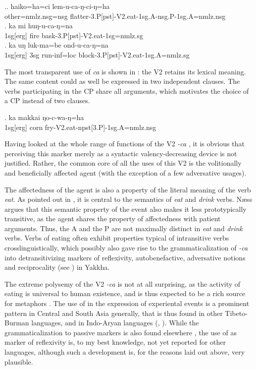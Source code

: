 \ex.\ag. haiko=ha=ci lem-u-ca-ŋ-ci-ŋ=ha\\
other{\sc =nmlz.nsg=nsg} flatter{\sc -3.P[pst]-V2.eat-1sg.A-nsg.P-1sg.A=nmlz.nsg}\\
\bg. ka mi huŋ-u-ca-ŋ=na\\
{\sc 1sg[erg]} fire bask{\sc -3.P[pst]-V2.eat-1sg=nmlz.sg}\\
\bg. ka uŋ luk-ma=be ond-u-ca-ŋ=na\\
{\sc 1sg[erg]} {\sc 3sg} run{\sc -inf=loc} block{\sc -3.P[pst]-V2.eat-1sg.A=nmlz.sg}\\

The most transparent use of \emph{ca} is shown in \Next: the V2 retains its lexical meaning. The same content could as well be expressed in two independent clauses. The verbs participating in the CP share all arguments, which motivates the choice of a CP instead of two clauses. 

\exg. ka makkai ŋo-c-wa-ŋ=ha\\
{\sc 1sg[erg]} corn fry{\sc -V2.eat-npst[3.P]-1sg.A=nmlz.nsg}\\


Having looked at the whole range of functions of the V2 \emph{-ca} , it is obvious that perceiving this marker merely as a syntactic valency-decreasing device is not justified. Rather, the common core of all the uses of this V2  is the volitionally and beneficially affected agent (with the exception of a few adversative usages). 

The affectedness of the agent is also a property of the literal meaning of the verb \emph{eat}. As pointed out in  \citet[37]{Naess2009_How}, it is central to the semantics of \emph{eat} and \emph{drink} verbs. Næss argues that this semantic property of the event also makes it less prototypically transitive, as the agent shares the property of affectedness with patient arguments. Thus, the A and the P are not maximally distinct in \emph{eat} and \emph{drink} verbs. Verbs of eating often exhibit properties typical of intransitive verbs crosslinguistically, which possibly also gave rise to the grammaticalization of \emph{-ca} into detransitivizing markers of reflexivity, autobenefactive, adversative notions  and reciprocality (see ) in Yakkha. 

The extreme polysemy of the V2 \emph{-ca} is not at all surprising, as the activity of eating is universal to human existence, and is thus expected to be a rich source for metaphors \citep{Newman2009_A-cross-linguistic}. The use of  in the expression of experiental events is a prominent pattern in Central and South Asia generally, that is thus found in other Tibeto-Burman languages, and in Indo-Aryan languages (\citealt[154]{Hooketal2009_The-semantic}, \citealt{Pramodini2010_Eat}). While the grammaticalization to passive markers is also found elsewhere \citep[122]{Heineetal2002_World}, the use of  as marker of reflexivity is, to my best knowledge, not yet reported for other languages, although such a development is, for the reasons laid out above, very plausible.


